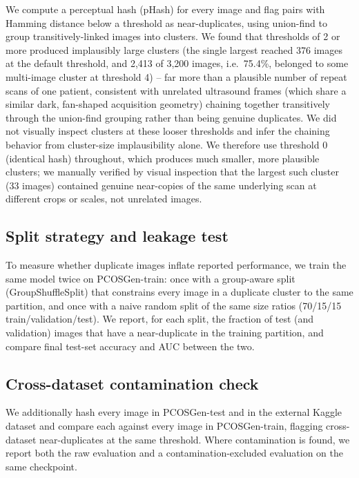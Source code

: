 \documentclass[conference]{IEEEtran}
\begin{document}
We compute a perceptual hash (pHash) for every image and flag pairs with Hamming distance below a threshold as near-duplicates, using union-find to group transitively-linked images into clusters. We found that thresholds of 2 or more produced implausibly large clusters (the single largest reached 376 images at the default threshold, and 2,413 of 3,200 images, i.e.\ 75.4\%, belonged to some multi-image cluster at threshold 4) -- far more than a plausible number of repeat scans of one patient, consistent with unrelated ultrasound frames (which share a similar dark, fan-shaped acquisition geometry) chaining together transitively through the union-find grouping rather than being genuine duplicates. We did not visually inspect clusters at these looser thresholds and infer the chaining behavior from cluster-size implausibility alone. We therefore use threshold 0 (identical hash) throughout, which produces much smaller, more plausible clusters; we manually verified by visual inspection that the largest such cluster (33 images) contained genuine near-copies of the same underlying scan at different crops or scales, not unrelated images.

\subsection{Split strategy and leakage test}

To measure whether duplicate images inflate reported performance, we train the same model twice on PCOSGen-train: once with a group-aware split (GroupShuffleSplit) that constrains every image in a duplicate cluster to the same partition, and once with a naive random split of the same size ratios (70/15/15 train/validation/test). We report, for each split, the fraction of test (and validation) images that have a near-duplicate in the training partition, and compare final test-set accuracy and AUC between the two.

\subsection{Cross-dataset contamination check}

We additionally hash every image in PCOSGen-test and in the external Kaggle dataset and compare each against every image in PCOSGen-train, flagging cross-dataset near-duplicates at the same threshold. Where contamination is found, we report both the raw evaluation and a contamination-excluded evaluation on the same checkpoint.
\end{document}
